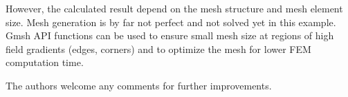 \documentclass[10pt,a4paper,titlepage]{article}
\begin{document}
	However, the calculated result depend on the mesh structure and mesh element size. Mesh generation is by far not perfect and not solved yet in this example. Gmsh API functions can be used to ensure small mesh size at regions of high field gradients (edges, corners) and to optimize the mesh for lower FEM computation time.
	
	The authors welcome any comments for further improvements.
	
	\clearpage
	\printbibliography
	
	
\end{document}
